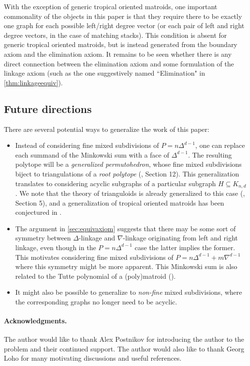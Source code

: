 \documentclass[letterpaper,reqno,11pt]{amsart}
\begin{document}
With the exception of generic tropical oriented matroids, one important commonality of the objects in this paper is that they require there to be exactly one graph for each possible left/right degree vector (or each pair of left and right degree vectors, in the case of matching stacks). This condition is absent for generic tropical oriented matroids, but is instead generated from the boundary axiom and the elimination axiom. It remains to be seen whether there is any direct connection between the elimination axiom and some formulation of the linkage axiom (such as the one suggestively named ``Elimination" in \cref{thm:linkageequiv}).

\subsection{Future directions}

There are several potential ways to generalize the work of this paper: \begin{itemize}
    \item Instead of considering fine mixed subdivisions of $P = n\Delta^{d-1}$, one can replace each summand of the Minkowski sum with a face of $\Delta^{d-1}$. The resulting polytope will be a \emph{generalized permutohedron}, whose fine mixed subdivisions biject to triangulations of a \emph{root polytope} (\cite{Permutohedra}, Section 12). This generalization translates to considering acyclic subgraphs of a particular subgraph $H\subseteq K_{n,d}$. We note that the theory of trianguloids is already generalized to this case (\cite{Trianguloids}, Section 5), and a generalization of tropical oriented matroids has been conjectured in \cite{TriangulationTOM}.
    \item The argument in \cref{sec:equivaxiom} suggests that there may be some sort of symmetry between $\Delta$-linkage and $\nabla$-linkage originating from left and right linkage, even though in the $P = n\Delta^{d-1}$ case the latter implies the former. This motivates considering fine mixed subdivisions of $P = n\Delta^{d-1} + m\nabla^{d-1}$ where this symmetry might be more apparent. This Minkowski sum is also related to the Tutte polynomial of a (poly)matroid (\cite{RootTutte, TutteLattice, UniversalTutte}).
    \item It might also be possible to generalize to \emph{non-fine} mixed subdivisions, where the corresponding graphs no longer need to be acyclic. 
\end{itemize}

\bigskip

\paragraph{\bfseries Acknowledgments.} 
The author would like to thank Alex Postnikov for introducing the author to the problem and their continued support. The author would also like to thank Georg Loho for many motivating discussions and useful references.




\end{document}
